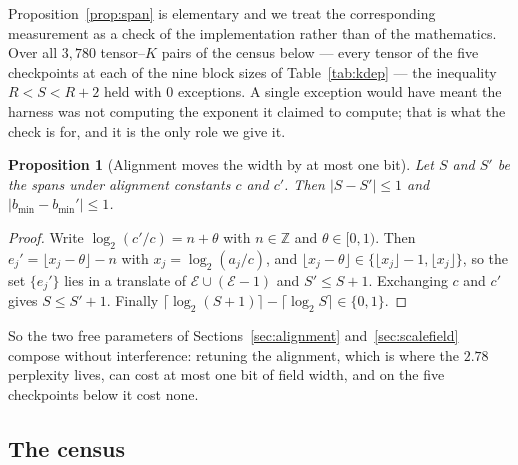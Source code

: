 \documentclass[11pt]{article}
\newtheorem{proposition}[theorem]{Proposition}
\theoremstyle{definition}
\begin{document}
Proposition~\ref{prop:span} is elementary and we treat the corresponding
measurement as a check of the implementation rather than of the mathematics.
Over all $3{,}780$ tensor--$K$ pairs of the census below --- every tensor of the
five checkpoints at each of the nine block sizes of Table~\ref{tab:kdep} --- the
inequality $R < S < R+2$ held with $0$ exceptions. A single exception would have
meant the harness was not computing the exponent it claimed to compute; that is
what the check is for, and it is the only role we give it.

\begin{proposition}[Alignment moves the width by at most one bit]
\label{prop:alignwidth}
Let $S$ and $S'$ be the spans under alignment constants $c$ and $c'$. Then
$|S - S'| \le 1$ and $|b_{\min} - b_{\min}'| \le 1$.
\end{proposition}

\begin{proof}
Write $\log_2(c'/c) = n + \theta$ with $n \in \mathbb{Z}$ and $\theta \in [0,1)$.
Then $e_j' = \lfloor x_j - \theta \rfloor - n$ with $x_j = \log_2(a_j/c)$, and
$\lfloor x_j - \theta \rfloor \in \{\lfloor x_j \rfloor - 1, \lfloor x_j\rfloor\}$,
so the set $\{e_j'\}$ lies in a translate of
$\mathcal{E} \cup (\mathcal{E} - 1)$ and $S' \le S+1$. Exchanging $c$ and $c'$
gives $S \le S'+1$. Finally
$\lceil \log_2 (S+1)\rceil - \lceil \log_2 S \rceil \in \{0,1\}$.
\end{proof}

So the two free parameters of Sections~\ref{sec:alignment} and~\ref{sec:scalefield}
compose without interference: retuning the alignment, which is where the $2.78$
perplexity lives, can cost at most one bit of field width, and on the five
checkpoints below it cost none.

\subsection{The census}
\label{sec:widthcensus}
\end{document}
